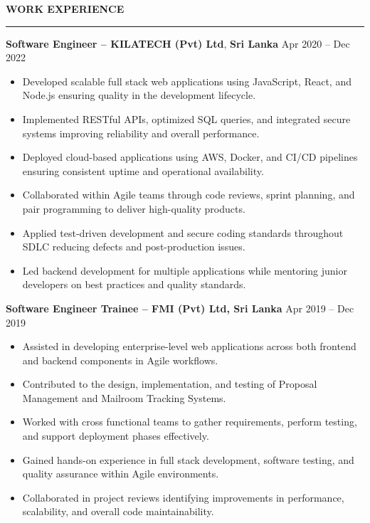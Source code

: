 \documentclass[10pt,letterpaper]{article}
\begin{document}
\vspace{8pt}

\textbf{WORK EXPERIENCE}\\[-8pt]
\noindent\rule{\textwidth}{1pt}

\vspace{-2pt}

\textbf{Software Engineer -- KILATECH (Pvt) Ltd}, \textbf{Sri Lanka} \hfill Apr 2020 -- Dec 2022

\vspace{-1pt}

\begin{itemize}
\item Developed scalable full stack web applications using JavaScript, React, and Node.js ensuring quality in the development lifecycle.
\item Implemented RESTful APIs, optimized SQL queries, and integrated secure systems improving reliability and overall performance.
\item Deployed cloud-based applications using AWS, Docker, and CI/CD pipelines ensuring consistent uptime and operational availability.
\item Collaborated within Agile teams through code reviews, sprint planning, and pair programming to deliver high-quality products.
\item Applied test-driven development and secure coding standards throughout SDLC reducing defects and post-production issues.
\item Led backend development for multiple applications while mentoring junior developers on best practices and quality standards.
\end{itemize}

\textbf{Software Engineer Trainee -- FMI (Pvt) Ltd, Sri Lanka} \hfill Apr 2019 -- Dec 2019

\vspace{-1pt}

\begin{itemize}
\item Assisted in developing enterprise-level web applications across both frontend and backend components in Agile workflows.
\item Contributed to the design, implementation, and testing of Proposal Management and Mailroom Tracking Systems.
\item Worked with cross functional teams to gather requirements, perform testing, and support deployment phases effectively.
\item Gained hands-on experience in full stack development, software testing, and quality assurance within Agile environments.
\item Collaborated in project reviews identifying improvements in performance, scalability, and overall code maintainability.
\end{itemize}
\end{document}
